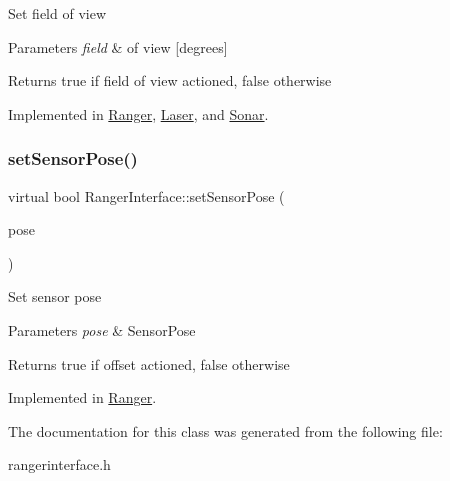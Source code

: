Set field of view 
\begin{DoxyParams}{Parameters}
{\em field} & of view \mbox{[}degrees\mbox{]} \\
\hline
\end{DoxyParams}
\begin{DoxyReturn}{Returns}
true if field of view actioned, false otherwise 
\end{DoxyReturn}


Implemented in \hyperlink{classRanger_afb5d392ca450bcce295e61c121d09157}{Ranger}, \hyperlink{classLaser_a5f140784aae7e82c2aa0f690548d6ebb}{Laser}, and \hyperlink{classSonar_a74d551d0ad61861ccf903f2535d799f0}{Sonar}.

\mbox{\label{classRangerInterface_a452301937b5ace7ded943d8aa76a061f}} 
\subsubsection{\texorpdfstring{set\+Sensor\+Pose()}{setSensorPose()}}
{\footnotesize\ttfamily virtual bool Ranger\+Interface\+::set\+Sensor\+Pose (\begin{DoxyParamCaption}\item[{\hyperlink{structranger_1_1SensorPose}{ranger\+::\+Sensor\+Pose}}]{pose }\end{DoxyParamCaption})\hspace{0.3cm}{\ttfamily [pure virtual]}}

Set sensor pose 
\begin{DoxyParams}{Parameters}
{\em pose} & Sensor\+Pose \\
\hline
\end{DoxyParams}
\begin{DoxyReturn}{Returns}
true if offset actioned, false otherwise 
\end{DoxyReturn}


Implemented in \hyperlink{classRanger_aa55ad45d83b8c095a495677ac8873f2b}{Ranger}.



The documentation for this class was generated from the following file\+:\begin{DoxyCompactItemize}
\item 
rangerinterface.\+h\end{DoxyCompactItemize}
